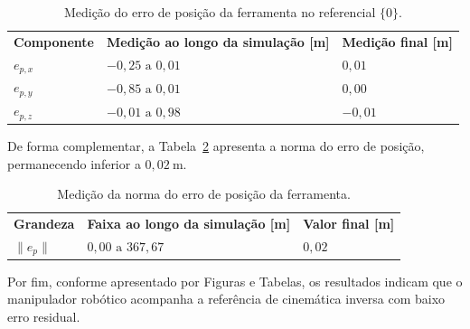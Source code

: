 \begin{table}[H]
\centering
\caption{Medição do erro de posição da ferramenta no referencial $\{0\}$.}
\label{tab_cap4_erro_pos_ferramenta}
\begin{tabularx}{\linewidth}{|
  >{\centering\arraybackslash}X|
  >{\centering\arraybackslash}X|
  >{\centering\arraybackslash}X|}
\hline
\textbf{Componente} &
\textbf{Medição ao longo da simulação [m]} &
\textbf{Medição final [m]} \\
\hhline{|=|=|=|}
$e_{p,x}$ & $-0{,}25 \text{ a } 0{,}01$ & $0{,}01$ \\
\hline
$e_{p,y}$ & $-0{,}85 \text{ a } 0{,}01$ & $0{,}00$ \\
\hline
$e_{p,z}$ & $-0{,}01 \text{ a } 0{,}98$ & $-0{,}01$ \\
\hline
\end{tabularx}
\end{table}

De forma complementar, a Tabela~\ref{tab_cap4_erro_pos_ferramenta_norma} apresenta a norma do erro de posição, permanecendo inferior a $0{,}02~\mathrm{m}$.

\begin{table}[H]
\centering
\caption{Medição da norma do erro de posição da ferramenta.}
\label{tab_cap4_erro_pos_ferramenta_norma}
\begin{tabularx}{\linewidth}{|
  >{\centering\arraybackslash}X|
  >{\centering\arraybackslash}X|
  >{\centering\arraybackslash}X|}
\hline
\textbf{Grandeza} &
\textbf{Faixa ao longo da simulação [m]} &
\textbf{Valor final [m]} \\
\hhline{|=|=|=|}
$\|e_p\|$ & $0{,}00 \text{ a } 367{,}67$ & $0{,}02$ \\
\hline
\end{tabularx}
\end{table}

Por fim, conforme apresentado por Figuras e Tabelas, os resultados indicam que o manipulador robótico acompanha a referência de cinemática inversa com baixo erro residual.